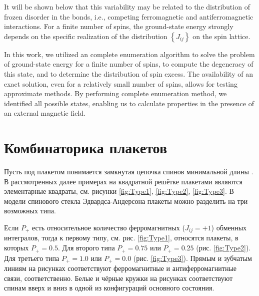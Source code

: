 \documentclass[utf8, babel, sor, jor, amsmath, amssymb, reprint]{elsarticle} %
\begin{document}
It will be shown below that this variability may be related to the distribution of frozen disorder in the bonds, i.e., competing ferromagnetic and antiferromagnetic interactions. For a finite number of spins, the ground-state energy strongly depends on the specific realization of the distribution $\left\lbrace J_{ij} \right\rbrace$ on the spin lattice.  

In this work, we utilized an complete enumeration algorithm \cite{dias2023ground, padalko2021parallel} to solve the problem of ground-state energy for a finite number of spins, to compute the degeneracy of this state, and to determine the distribution of spin excess. The availability of an exact solution, even for a relatively small number of spins, allows for testing approximate methods. By performing complete enumeration method, we identified all possible states, enabling us to calculate properties in the presence of an external magnetic field.

\section{Комбинаторика плакетов}

Пусть под плакетом понимается замкнутая цепочка спинов минимальной длины \cite{lebrecht2015j}. В рассмотренных далее примерах на квадратной решётке плакетами являются элементарные квадраты, см. рисунки \ref{fig:Type1}, \ref{fig:Type2}, \ref{fig:Type3}. В модели спинового стекла Эдвардса-Андерсона плакеты можно разделить на три возможных типа. 

Если $P_+$ есть относительное количество ферромагнитных ($J_{ij}=+1$) обменных интегралов, тогда к первому типу, см. рис. \ref{fig:Type1}, относятся плакеты, в которых $P_+=0.5$. Для второго типа $P_+=0.75$ или $P_+=0.25$ (рис. \ref{fig:Type2}). Для третьего типа $P_+=1.0$ или $P_+=0.0$ (рис. \ref{fig:Type3}). Прямым и зубчатым линиям на рисунках соответствуют ферромагнитные и антиферромагнитные связи, соответственно. Белые и чёрные кружки на рисунках соответствуют спинам вверх и вниз в одной из конфигураций основного состояния.
\end{document}
